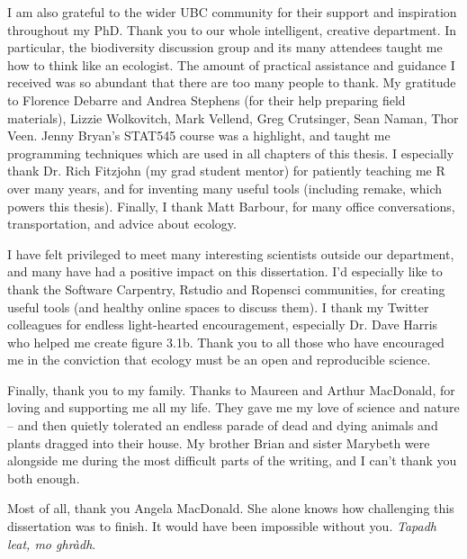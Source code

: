 I am also grateful to the wider UBC community for their support and inspiration throughout my PhD. Thank you to our whole intelligent, creative department. In particular, the biodiversity discussion group and its many attendees taught me how to think like an ecologist. The amount of practical assistance and guidance I received was so abundant that there are too many people to thank. My gratitude to Florence Debarre and Andrea Stephens (for their help preparing field materials), Lizzie Wolkovitch, Mark Vellend, Greg Crutsinger, Sean Naman, Thor Veen. Jenny Bryan's STAT545 course was a highlight, and taught me programming techniques which are used in all chapters of this thesis. I especially thank Dr. Rich Fitzjohn (my grad student mentor) for patiently teaching me R over many years, and for inventing many useful tools (including remake, which powers this thesis). Finally, I thank Matt Barbour, for many office conversations, transportation, and advice about ecology.

I have felt privileged to meet many interesting scientists outside our department, and many have had a positive impact on this dissertation. I'd especially like to thank the Software Carpentry, Rstudio and Ropensci communities, for creating useful tools (and healthy online spaces to discuss them). I thank my Twitter colleagues for endless light-hearted encouragement, especially Dr. Dave Harris who helped me create figure 3.1b. Thank you to all those who have encouraged me in the conviction that ecology must be an open and reproducible science.

Finally, thank you to my family. Thanks to Maureen and Arthur MacDonald, for loving and supporting me all my life. They gave me my love of science and nature -- and then quietly tolerated an endless parade of dead and dying animals and plants dragged into their house. My brother Brian and sister Marybeth were alongside me during the most difficult parts of the writing, and I can't thank you both enough. 

Most of all, thank you Angela MacDonald. She alone knows how challenging this dissertation was to finish. It would have been impossible without you. \emph{Tapadh leat, mo ghr\`adh}.



